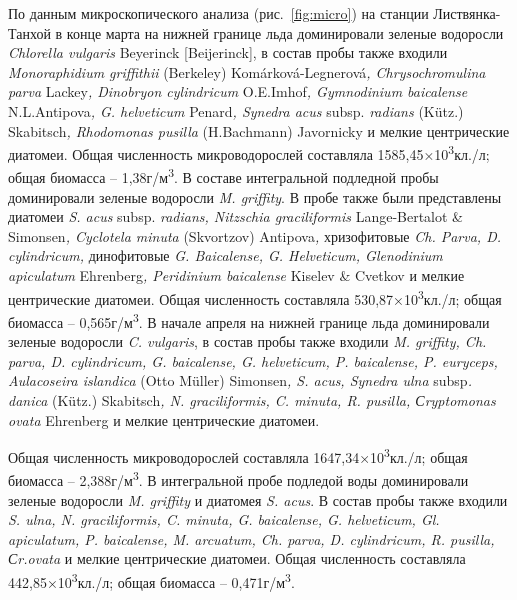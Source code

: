 \documentclass[a4paper,12pt,openany,final]{extreport}
\begin{document}
По данным микроскопического анализа (рис.~\ref{fig:micro}) на станции Листвянка-Танхой
в конце марта на нижней границе льда доминировали зеленые водоросли
\emph{Chlorella vulgaris} Beyerinck {[}Beijerinck{]}, в состав пробы
также входили \emph{Monoraphidium griffithii} (Berkeley)
Komárková-Legnerová\emph{, Chrysochromulina parva} Lackey\emph{,
Dinobryon cylindricum} O.E.Imhof\emph{, Gymnodinium baicalense}
N.L.Antipova\emph{, G. helveticum} Penard\emph{, Synedra acus} subsp.
\emph{radians} (Kütz.) Skabitsch\emph{, Rhodomonas pusilla} (H.Bachmann)
Javornicky и мелкие центрические диатомеи. Общая численность
микроводорослей составляла 1585,45×10\textsuperscript{3}кл./л; общая
биомасса -- 1,38г/м\textsuperscript{3}. В составе интегральной подледной
пробы доминировали зеленые водоросли \emph{M. griffity}. В пробе также
были представлены диатомеи \emph{S. acus} subsp. \emph{radians,
Nitzschia graciliformis} Lange-Bertalot \& Simonsen\emph{, Cyclotela
minuta} (Skvortzov) Antipova\emph{,} хризофитовые \emph{Ch. Parva, D.
cylindricum,} динофитовые \emph{G. Baicalense, G. Helveticum,
Glenodinium apiculatum} Ehrenberg\emph{, Peridinium baicalense} Kiselev
\& Cvetkov и мелкие центрические диатомеи. Общая численность составляла
530,87×10\textsuperscript{3}кл./л; общая биомасса --
0,565г/м\textsuperscript{3}. В начале апреля на нижней границе льда
доминировали зеленые водоросли \emph{C. vulgaris}, в состав пробы также
входили \emph{M. griffity, Ch. parva, D. cylindricum, G. baicalense, G.
helveticum, P. baicalense, P. euryceps, Aulacoseira islandica} (Otto
Müller) Simonsen\emph{, S. acus, Synedra ulna} subsp\emph{. danica}
(Kütz.) Skabitsch\emph{, N. graciliformis, C. minuta, R. pusilla,
Сryptomonas ovata} Ehrenberg и мелкие центрические диатомеи.


Общая численность микроводорослей составляла
1647,34×10\textsuperscript{3}кл./л; общая биомасса --
2,388г/м\textsuperscript{3}. В интегральной пробе подледой воды
доминировали зеленые водоросли \emph{M. griffity} и диатомея \emph{S.
acus}. В состав пробы также входили \emph{S. ulna, N. graciliformis, C.
minuta, G. baicalense, G. helveticum, Gl. apiculatum, P. baicalense, M.
arcuatum, Ch. parva, D. cylindricum, R. pusilla, Сr.ovata} и мелкие
центрические диатомеи. Общая численность составляла
442,85×10\textsuperscript{3}кл./л; общая биомасса --
0,471г/м\textsuperscript{3}.
\end{document}
